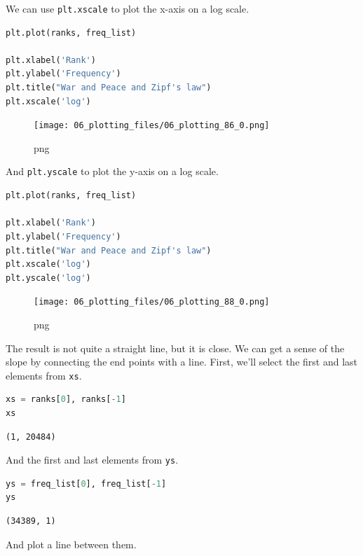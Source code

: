 \documentclass[
]{book}
\newcommand{\passthrough}[1]{#1}
\begin{document}
We can use \passthrough{\lstinline!plt.xscale!} to plot the x-axis on a
log scale.

\begin{lstlisting}[language=Python]
plt.plot(ranks, freq_list)

plt.xlabel('Rank')
plt.ylabel('Frequency')
plt.title("War and Peace and Zipf's law")
plt.xscale('log')
\end{lstlisting}

\begin{figure}
\centering
\texttt{[image: 06\_plotting\_files/06\_plotting\_86\_0.png]}
\caption{png}
\end{figure}

And \passthrough{\lstinline!plt.yscale!} to plot the y-axis on a log
scale.

\begin{lstlisting}[language=Python]
plt.plot(ranks, freq_list)

plt.xlabel('Rank')
plt.ylabel('Frequency')
plt.title("War and Peace and Zipf's law")
plt.xscale('log')
plt.yscale('log')
\end{lstlisting}

\begin{figure}
\centering
\texttt{[image: 06\_plotting\_files/06\_plotting\_88\_0.png]}
\caption{png}
\end{figure}

The result is not quite a straight line, but it is close. We can get a
sense of the slope by connecting the end points with a line. First,
we'll select the first and last elements from
\passthrough{\lstinline!xs!}.

\begin{lstlisting}[language=Python]
xs = ranks[0], ranks[-1]
xs
\end{lstlisting}

\begin{lstlisting}
(1, 20484)
\end{lstlisting}

And the first and last elements from \passthrough{\lstinline!ys!}.

\begin{lstlisting}[language=Python]
ys = freq_list[0], freq_list[-1]
ys
\end{lstlisting}

\begin{lstlisting}
(34389, 1)
\end{lstlisting}

And plot a line between them.
\end{document}
